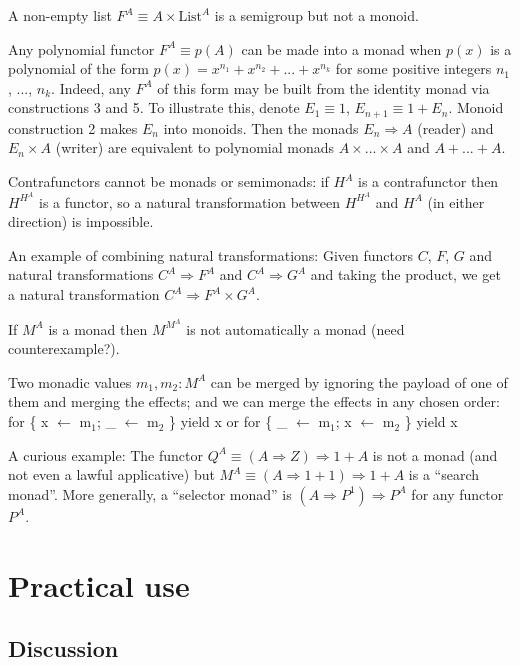 \vspace{-0.2cm}A non-empty list $F^{A}\equiv A\times\text{List}^{A}$
is a semigroup but not a monoid.

Any polynomial functor $F^{A}\equiv p(A)$ can be made into a monad
when $p(x)$ is a polynomial of the form $p(x)=x^{n_{1}}+x^{n_{2}}+...+x^{n_{k}}$
for some positive integers $n_{1}$, ..., $n_{k}$. Indeed, any $F^{A}$
of this form may be built from the identity monad via constructions
3 and 5. To illustrate this, denote $E_{1}\equiv1$, $E_{n+1}\equiv1+E_{n}$.
Monoid construction 2 makes $E_{n}$ into monoids. Then the monads
$E_{n}\Rightarrow A$ (reader) and $E_{n}\times A$ (writer) are equivalent
to polynomial monads $A\times...\times A$ and $A+...+A$.

Contrafunctors cannot be monads or semimonads: if $H^{A}$ is a contrafunctor
then $H^{H^{A}}$ is a functor, so a natural transformation between
$H^{H^{A}}$ and $H^{A}$ (in either direction) is impossible.

An example of combining natural transformations: Given functors $C$,
$F$, $G$ and natural transformations $C^{A}\Rightarrow F^{A}$ and
$C^{A}\Rightarrow G^{A}$ and taking the product, we get a natural
transformation $C^{A}\Rightarrow F^{A}\times G^{A}$. 

If $M^{A}$ is a monad then $M^{M^{A}}$ is not automatically a monad
(need counterexample?).

Two monadic values $m_{1},m_{2}:M^{A}$ can be merged by ignoring
the payload of one of them and merging the effects; and we can merge
the effects in any chosen order: for \{ x $\leftarrow$ m$_{1}$;
\_ $\leftarrow$ m$_{2}$ \} yield x or for \{ \_ $\leftarrow$ m$_{1}$;
x $\leftarrow$ m$_{2}$ \} yield x 

A curious example: The functor $Q^{A}\equiv\left(A\Rightarrow Z\right)\Rightarrow1+A$
is not a monad (and not even a lawful applicative) but $M^{A}\equiv\left(A\Rightarrow1+1\right)\Rightarrow1+A$
is a ``search monad''. More generally, a ``selector monad'' is
$\left(A\Rightarrow P^{1}\right)\Rightarrow P^{A}$ for any functor
$P^{A}$.

\section{Practical use}

\subsection{Discussion}

